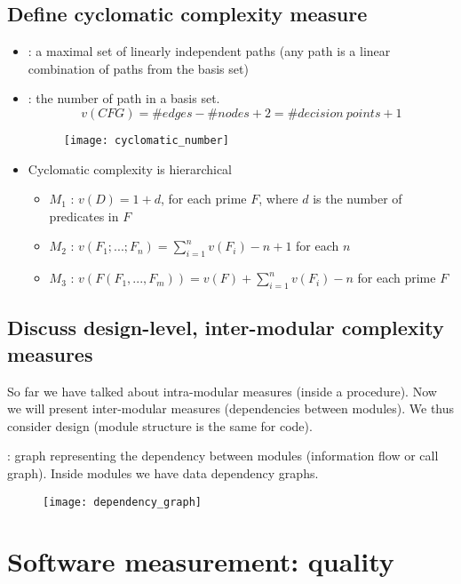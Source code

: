 \section{Define cyclomatic complexity measure}

\begin{itemize}
    \item {} : a maximal set of linearly independent paths (any path is a linear combination of paths from the basis set)
    \item {}: the number of path in a basis set.
    $$v(CFG)= \#edges - \#nodes + 2 = \#decision\ points + 1$$
    \begin{figure}[H]
        \centering
        \texttt{[image: cyclomatic\_number]}
    \end{figure}
    \item Cyclomatic complexity is hierarchical
    \begin{itemize}
        \item $M_1$ : $v(D) = 1 + d$, for each prime $F$, where $d$ is the number of predicates in $F$
        \item $M_2$ : $v(F_1; ...; F_n) = \sum_{i=1}^n v(F_i) - n + 1$ for each $n$
        \item $M_3$ : $v(F(F_1, ..., F_m)) = v(F) + \sum_{i=1}^n v(F_i) - n$ for each prime $F$
    \end{itemize}
\end{itemize}

\section{Discuss design-level, inter-modular complexity measures}

So far we have talked about intra-modular measures (inside a procedure). Now we will present inter-modular measures (dependencies between modules). We thus consider design (module structure is the same for code).

 : graph representing the dependency between modules (information flow or call graph). Inside modules we have data dependency graphs.
\begin{figure}[H]
    \centering
    \texttt{[image: dependency\_graph]}
\end{figure}

\chapter{Software measurement: quality}

